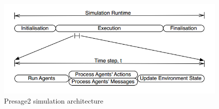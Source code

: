 \begin{figure}[h!]
	\centering
	\includegraphics[width=\textwidth]{img/presage2-lifecycle.png}
	\caption{Presage2 simulation architecture~\cite{Sam-Transfer-Report}}
	\label{fig:presage2-lifecycle}
\end{figure}
